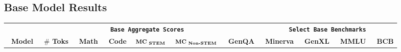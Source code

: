 \documentclass[table]{ai2style/ai2}
\begin{document}
\subsection{Base Model Results}
\label{subsec:pretrain_base_model_results}
\begin{table}[ht!]
\setlength\tabcolsep{2pt} 
\renewcommand{\arraystretch}{0.9}
{\fontsize{8}{8}\selectfont
\begin{center}
\begin{footnotesize}
\begin{tabular}{lc|ccccc|cccc}
\toprule
    &\multicolumn{6}{c}{\quad \quad \quad \quad \textbf{\texttt{Base Aggregate Scores}}} & \multicolumn{4}{c}{\textbf{\texttt{Select Base Benchmarks}}} \\
    {\textbf{\fontsize{8}{8}\selectfont~Model}} &
    {\textbf{\fontsize{8}{8}\selectfont~$\#$ Toks}} & 
    {\textbf{\fontsize{8}{8}\selectfont~Math}} & 
    {\textbf{\fontsize{8}{8}\selectfont~Code}} & 
    {$\textbf{\fontsize{8}{8}\selectfont~MC}_\textbf{\fontsize{6}{6}\selectfont~STEM}$} & 
    {$\textbf{\fontsize{8}{8}\selectfont~MC}_\textbf{\fontsize{6}{6}\selectfont~Non-STEM}$} & 
    {\textbf{\fontsize{8}{8}\selectfont~GenQA}} & 
    {\textbf{\fontsize{8}{8}\selectfont~Minerva}} &
    {\textbf{\fontsize{8}{8}\selectfont~GenXL}} &
    {\textbf{\fontsize{8}{8}\selectfont~MMLU}} & 
    {\textbf{\fontsize{8}{8}\selectfont~BCB}}
    \\
\midrule


\end{tabular}
\end{footnotesize}
\end{center}}
\end{table}
\end{document}

